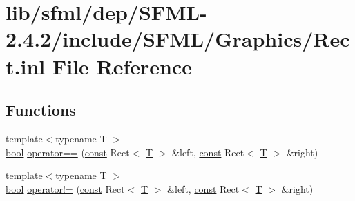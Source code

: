 \hypertarget{sfml_2dep_2_s_f_m_l-2_84_82_2include_2_s_f_m_l_2_graphics_2_rect_8inl}{\section{lib/sfml/dep/\-S\-F\-M\-L-\/2.4.2/include/\-S\-F\-M\-L/\-Graphics/\-Rect.inl File Reference}
\label{sfml_2dep_2_s_f_m_l-2_84_82_2include_2_s_f_m_l_2_graphics_2_rect_8inl}
}
\subsection*{Functions}
\begin{DoxyCompactItemize}
\item 
{\footnotesize template$<$typename T $>$ }\\\hyperlink{term__entry_8h_a002004ba5d663f149f6c38064926abac}{bool} \hyperlink{sfml_2dep_2_s_f_m_l-2_84_82_2include_2_s_f_m_l_2_graphics_2_rect_8inl_ab3488b5dbd0e587c4d7cb80605affc46}{operator==} (\hyperlink{term__entry_8h_a57bd63ce7f9a353488880e3de6692d5a}{const} Rect$<$ \hyperlink{curses_8priv_8h_a5ef253115820acf7d27f3c5c3b02a0f0}{T} $>$ \&left, \hyperlink{term__entry_8h_a57bd63ce7f9a353488880e3de6692d5a}{const} Rect$<$ \hyperlink{curses_8priv_8h_a5ef253115820acf7d27f3c5c3b02a0f0}{T} $>$ \&right)
\item 
{\footnotesize template$<$typename T $>$ }\\\hyperlink{term__entry_8h_a002004ba5d663f149f6c38064926abac}{bool} \hyperlink{sfml_2dep_2_s_f_m_l-2_84_82_2include_2_s_f_m_l_2_graphics_2_rect_8inl_a03fc4c105687b7d0f07b6b4ed4b45581}{operator!=} (\hyperlink{term__entry_8h_a57bd63ce7f9a353488880e3de6692d5a}{const} Rect$<$ \hyperlink{curses_8priv_8h_a5ef253115820acf7d27f3c5c3b02a0f0}{T} $>$ \&left, \hyperlink{term__entry_8h_a57bd63ce7f9a353488880e3de6692d5a}{const} Rect$<$ \hyperlink{curses_8priv_8h_a5ef253115820acf7d27f3c5c3b02a0f0}{T} $>$ \&right)
\end{DoxyCompactItemize}



